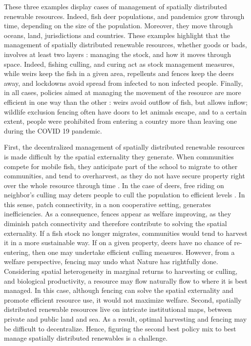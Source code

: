 These three examples display cases of management of  spatially distributed renewable resources. Indeed, fish deer populations, and pandemics grow through time, depending on the size of the population. Moreover, they move through oceans, land, jurisdictions and countries. These examples highlight that the management of spatially distributed renewable resources, whether goods or bads, involves at least two layers : managing the stock, and how it moves through space. Indeed, fishing culling, and curing act as stock management measures, while weirs keep the fish in a given area, repellents and fences keep the deers away, and lockdowns avoid spread from infected to non infected people. Finally, in all cases, policies aimed at managing the movement of the resource are more efficient in one way than the other : weirs avoid outflow of fish, but allows inflow; wildlife exclusion fencing often have doors to let animals escape, and to a certain extent, people were prohibited from entering a country more than leaving one during the COVID 19 pandemic. 


First, the decentralized management of spatially distributed renewable resources is made difficult by the spatial externality they generate. When communities compete for mobile fish, they anticipate part of the school to migrate to other communities, and tend to overharvest, as they do not have secure property right over the whole resource through time \citep{kaffine_unitization_2010}. In the case of deers, free riding on neighbor's culling may deters people to cull the population to efficient levels \citep{costello_private_2017}. In this sense, patch connectivity, in a non cooperative setting, generates inefficiencies. As a consequence, fences appear as welfare improving, as they diminish patch connectivity and therefore contribute to solving the spatial externality. If a fish stock no longer migrates, communities would tend to harvest it in a more sustainable way. If on a given property, deers have no chance of re-entering, then one may undertake efficient culling measures. However, from a welfare perspective, fencing may undo what Nature has rightfully done. Considering spatial heterogeneity in marginal returns to harvesting or culling, and biological productivity, a resource may flow naturally flow to where it is best managed. In this case, although fencing can solve the spatial externality and promote efficient resource use, it would not maximize welfare. Second,  spatially distributed renewable resources live on intricate institutional maps, between private and public land and sea. As a result, optimal harvesting and fencing may be difficult to decentralize. Hence, figuring the second best policy mix to best manage spatially distributed renewables is a challenge. 

